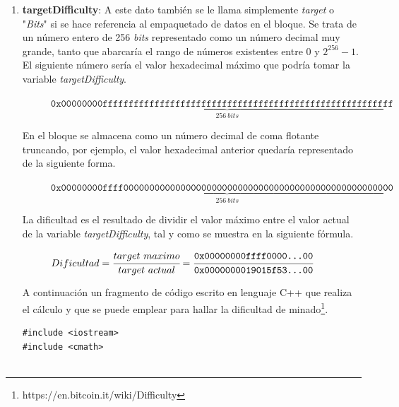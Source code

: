 \documentclass{article}
\begin{document}
\begin{enumerate}
\begin{verbatim}
    printf("Timestamp epoch: %ld\n", (long) tod);
}
        \end{verbatim}
        
    
        \item \textbf{targetDifficulty}: A este dato también se le llama simplemente \textit{target} o "\textit{Bits}" si se hace referencia al empaquetado de datos en el bloque. Se trata de un número entero de 256 \textit{bits} representado como un número decimal muy grande, tanto que abarcaría el rango de números existentes entre $0$ y $2^{256}-1$. El siguiente número sería el valor hexadecimal máximo que podría tomar la variable \textit{targetDifficulty}.
        
            \begin{figure}[H]
                \centering
                \scriptsize{
                $\texttt{0x}\underbrace{\texttt{00000000ffffffffffffffffffffffffffffffffffffffffffffffffffffffff}}_{256\ bits}$
                }
            \end{figure}
        
        En el bloque se almacena como un número decimal de coma flotante truncando, por ejemplo, el valor hexadecimal anterior quedaría representado de la siguiente forma.
        
            \begin{figure}[H]
                \centering
                \scriptsize{
                $\texttt{0x}\underbrace{\texttt{00000000ffff0000000000000000000000000000000000000000000000000000}}_{256\ bits}$
                }
            \end{figure}
        
        La dificultad es el resultado de dividir el valor máximo entre el valor actual de la variable \textit{targetDifficulty}, tal y como se muestra en la siguiente fórmula.
        
            \begin{figure}[H]
                \centering
                $Dificultad = \cfrac{target \ maximo}{target \ actual} = \cfrac{\texttt{0x00000000ffff0000...00}}{\texttt{0x0000000019015f53...00}}$
            \end{figure}
        
        A continuación un fragmento de código escrito en lenguaje C++ que realiza el cálculo y que se puede emplear para hallar la dificultad de minado\footnote{https://en.bitcoin.it/wiki/Difficulty}.
        
        \begin{verbatim}
#include <iostream>
#include <cmath>


\end{verbatim}
\end{enumerate}
\end{document}
